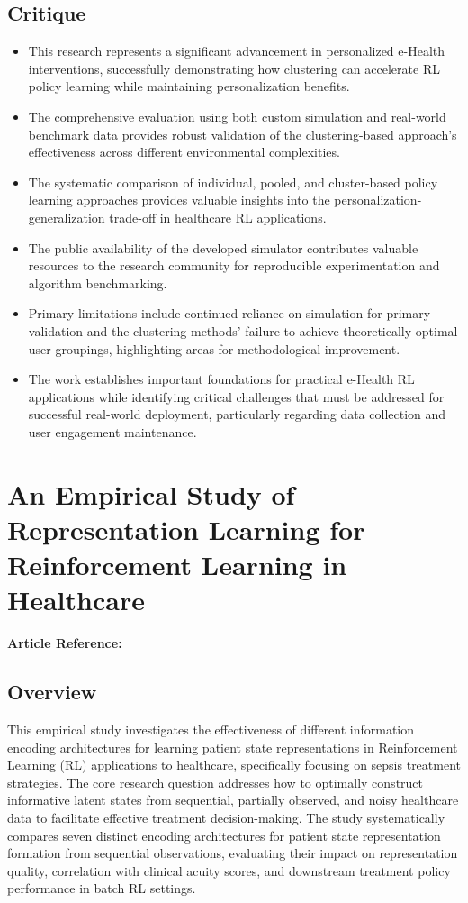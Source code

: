 \subsection*{Critique}
\begin{itemize}
    \item This research represents a significant advancement in personalized e-Health interventions, successfully demonstrating how clustering can accelerate RL policy learning while maintaining personalization benefits.
    \item The comprehensive evaluation using both custom simulation and real-world benchmark data provides robust validation of the clustering-based approach's effectiveness across different environmental complexities.
    \item The systematic comparison of individual, pooled, and cluster-based policy learning approaches provides valuable insights into the personalization-generalization trade-off in healthcare RL applications.
    \item The public availability of the developed simulator contributes valuable resources to the research community for reproducible experimentation and algorithm benchmarking.
    \item Primary limitations include continued reliance on simulation for primary validation and the clustering methods' failure to achieve theoretically optimal user groupings, highlighting areas for methodological improvement.
    \item The work establishes important foundations for practical e-Health RL applications while identifying critical challenges that must be addressed for successful real-world deployment, particularly regarding data collection and user engagement maintenance.
\end{itemize}

\section{An Empirical Study of Representation Learning for Reinforcement Learning in Healthcare}
\textbf{Article Reference:} \cite{killianEmpiricalStudyRepresentation2020}

\subsection*{Overview}
This empirical study investigates the effectiveness of different information encoding architectures for learning patient state representations in Reinforcement Learning (RL) applications to healthcare, specifically focusing on sepsis treatment strategies. The core research question addresses how to optimally construct informative latent states from sequential, partially observed, and noisy healthcare data to facilitate effective treatment decision-making. The study systematically compares seven distinct encoding architectures for patient state representation formation from sequential observations, evaluating their impact on representation quality, correlation with clinical acuity scores, and downstream treatment policy performance in batch RL settings.

